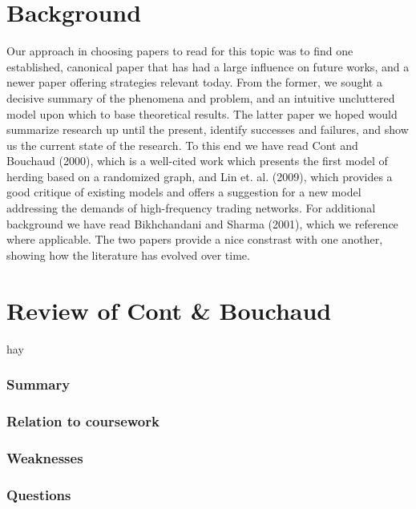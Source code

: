 \documentclass{article}
\begin{document}
\section{Background}
Our approach in choosing papers to read for this topic was to find one established, canonical paper that has had a large influence on future works, and a newer paper offering strategies relevant today.
From the former, we sought a decisive summary of the phenomena and problem, and an intuitive uncluttered model upon which to base theoretical results.
The latter paper we hoped would summarize research up until the present, identify successes and failures, and show us the current state of the research.
To this end we have read Cont and Bouchaud (2000), which is a well-cited work which presents the first model of herding based on a randomized graph, and Lin et. al. (2009), which provides a good critique of existing models and offers a suggestion for a new model addressing the demands of high-frequency trading networks.
For additional background we have read Bikhchandani and Sharma (2001), which we reference where applicable.
The two papers provide a nice constrast with one another, showing how the literature has evolved over time.

\section{Review of Cont \& Bouchaud}
hay 

\subsubsection{Summary}
\subsubsection{Relation to coursework}
\subsubsection{Weaknesses}
\subsubsection{Questions}
\end{document}

